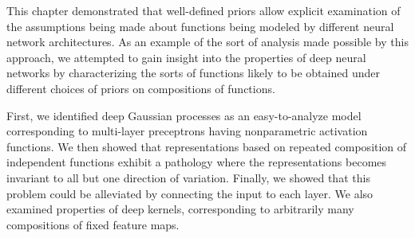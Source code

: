 This chapter demonstrated that well-defined priors allow explicit examination of the assumptions being made about functions being modeled by different neural network architectures.
As an example of the sort of analysis made possible by this approach, we attempted to gain insight into the properties of deep neural networks by characterizing the sorts of functions likely to be obtained under different choices of priors on compositions of functions.

First, we identified deep Gaussian processes as an easy-to-analyze model corresponding to multi-layer preceptrons having nonparametric activation functions.
%
We then showed that representations based on repeated composition of independent functions exhibit a pathology where the representations becomes invariant to all but one direction of variation. %
Finally, we showed that this problem could be alleviated by connecting the input to each layer.
%
We also examined properties of deep kernels, corresponding to arbitrarily many compositions of fixed feature maps.


